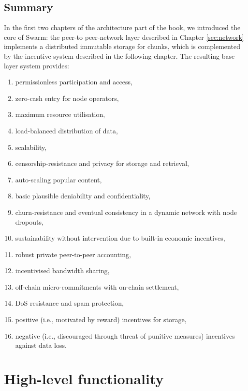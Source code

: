 \section{Summary}


In the first two chapters of the architecture part of the book, we introduced the core of Swarm: the peer-to peer-network layer described in Chapter \ref{sec:network} implements a distributed immutable storage for chunks, which is complemented by the incentive system described in the following chapter. The resulting base layer system provides:

\begin{enumerate}[noitemsep]
    \item permissionless participation and access,
    \item zero-cash entry for node operators,
    \item maximum resource utilisation, 
    \item load-balanced distribution of data,
    \item scalability, 
    \item censorship-resistance and privacy for storage and retrieval,
    \item auto-scaling popular content,
    \item basic plausible deniability and confidentiality,
    \item churn-resistance and eventual consistency in a dynamic network with node dropouts,
    \item sustainability without intervention due to built-in economic incentives,
    \item robust private peer-to-peer accounting, 
    \item incentivised bandwidth sharing,
    \item off-chain micro-commitments with on-chain settlement,
    \item DoS resistance and spam protection,
    \item positive (i.e., motivated by reward) incentives for storage,
    \item negative (i.e., discouraged through threat of punitive measures) incentives against data loss.
\end{enumerate}


\chapter{High-level functionality}\label{sec:high-level-functionality}



